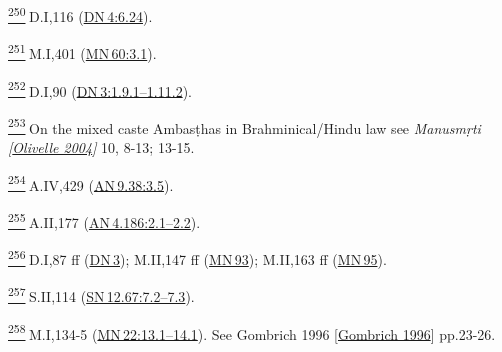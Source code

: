 \label{footprints_split_024.html_fn250}
\hyperref[footprints_split_010.htmlux5cux23fnref250]{\textsuperscript{250}} D.I,116
(\href{https://suttacentral.net/dn4/en/sujato\#6.24}{DN\,4:6.24}).

\label{footprints_split_024.html_fn251}
\hyperref[footprints_split_010.htmlux5cux23fnref251]{\textsuperscript{251}} M.I,401
(\href{https://suttacentral.net/mn60/en/sujato\#3.1}{MN\,60:3.1}).

\label{footprints_split_024.html_fn252}
\hyperref[footprints_split_010.htmlux5cux23fnref252]{\textsuperscript{252}} D.I,90
(\href{https://suttacentral.net/dn3/en/sujato\#1.9.1}{DN\,3:1.9.1--1.11.2}).

\label{footprints_split_024.html_fn253}
\hyperref[footprints_split_010.htmlux5cux23fnref253]{\textsuperscript{253}} On
the mixed caste Ambasṭhas in Brahminical/Hindu law see \emph{{Manusmṛti
{{[}\hyperref[footprints_split_022.htmlux5cux23Olivelleux5cux25202004]{Olivelle
2004}{]}}}} 10, 8-13; 13-15.

\label{footprints_split_024.html_fn254}
\hyperref[footprints_split_010.htmlux5cux23fnref254]{\textsuperscript{254}} A.IV,429
(\href{https://suttacentral.net/an9.38/en/sujato\#3.5}{AN\,9.38:3.5}).

\label{footprints_split_024.html_fn255}
\hyperref[footprints_split_010.htmlux5cux23fnref255]{\textsuperscript{255}} A.II,177
(\href{https://suttacentral.net/an4.186/en/sujato\#2.1}{AN\,4.186:2.1--2.2}).

\label{footprints_split_024.html_fn256}
\hyperref[footprints_split_010.htmlux5cux23fnref256]{\textsuperscript{256}} D.I,87
ff (\href{https://suttacentral.net/dn3/en/sujato}{DN\,3}); M.II,147 ff
(\href{https://suttacentral.net/mn93/en/sujato}{MN\,93}); M.II,163 ff
(\href{https://suttacentral.net/mn95/en/sujato}{MN\,95}).

\label{footprints_split_024.html_fn257}
\hyperref[footprints_split_010.htmlux5cux23fnref257]{\textsuperscript{257}} S.II,114
(\href{https://suttacentral.net/sn12.67/en/sujato\#7.2}{SN\,12.67:7.2--7.3}).

\label{footprints_split_024.html_fn258}
\hyperref[footprints_split_010.htmlux5cux23fnref258]{\textsuperscript{258}} M.I,134-5
(\href{https://suttacentral.net/mn22/en/sujato\#13.1}{MN\,22:13.1--14.1}).
See {Gombrich 1996
{{[}\hyperref[footprints_split_022.htmlux5cux23Gombrichux5cux25201996]{Gombrich
1996}{]}}} pp.23-26.

